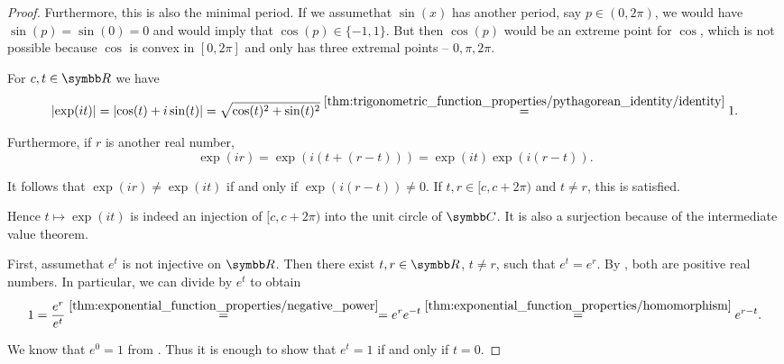 \begin{proof}
  Furthermore, this is also the minimal period. If we assume\LEM that \( \sin(x) \) has another period, say \( p \in (0, 2\pi) \), we would have \( \sin(p) = \sin(0) = 0 \) and  would imply that \( \cos(p) \in \{ -1, 1 \} \). But then \( \cos(p) \) would be an extreme point for \( \cos \), which is not possible because \( \cos \) is convex in \( [0, 2\pi] \) and only has three extremal points -- \( 0, \pi, 2\pi \).

   For \( c, t \in \BR \) we have
  \begin{equation*}
    \left\vert \exp(it) \right\vert
    =
    \left\vert \cos(t) + i\sin(t) \right\vert
    =
    \sqrt{\cos(t)^2 + \sin(t)^2}
    \overset {\ref{thm:trigonometric_function_properties/pythagorean_identity/identity}} =
    1.
  \end{equation*}

  Furthermore, if \( r \) is another real number,
  \begin{equation}
    \exp(ir)
    =
    \exp(i(t + (r - t)))
    =
    \exp(it) \exp(i(r - t)).
  \end{equation}

  It follows that \( \exp(ir) \neq \exp(it) \) if and only if \( \exp(i(r - t)) \neq 0 \). If \( t, r \in [c, c + 2\pi) \) and \( t \neq r \), this is satisfied.

  Hence \( t \mapsto \exp(it) \) is indeed an injection of \( [c, c + 2\pi) \) into the unit circle of \( \BC \). It is also a surjection because of the intermediate value theorem.

   First, assume\LEM that \( e^t \) is not injective on \( \BR \). Then there exist \( t, r \in \BR \), \( t \neq r \), such that \( e^t = e^r \). By , both are positive real numbers. In particular, we can divide by \( e^t \) to obtain
  \begin{equation*}
    1
    =
    \frac {e^r} {e^t}
    \overset {\ref{thm:exponential_function_properties/negative_power}} =
    =
    e^r e^{-t}
    \overset {\ref{thm:exponential_function_properties/homomorphism}} =
    e^{r - t}.
  \end{equation*}

  We know that \( e^0 = 1 \) from . Thus it is enough to show that \( e^t = 1 \) if and only if \( t = 0 \).


\end{proof}
